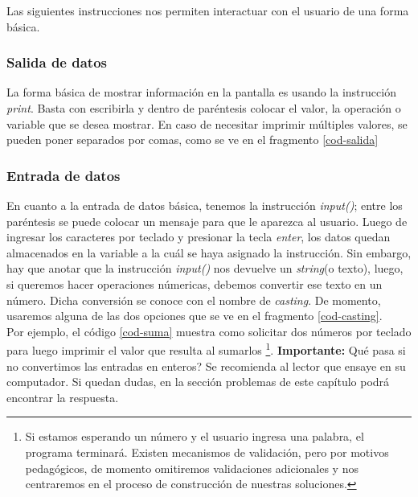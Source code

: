 Las siguientes instrucciones nos permiten interactuar con el usuario de una forma básica.

\subsubsection{Salida de datos}

La forma básica de mostrar información en la pantalla es usando la instrucción \emph{print}. Basta con escribirla y dentro de paréntesis colocar el valor, la operación o variable que se desea mostrar. En caso de necesitar imprimir múltiples valores, se pueden poner separados por comas, como se ve en el fragmento \ref{cod-salida} \\



\subsubsection{Entrada de datos}

En cuanto a la entrada de datos básica, tenemos la instrucción \emph{input()}; entre los paréntesis se puede colocar un mensaje para que le aparezca al usuario. Luego de ingresar los caracteres por teclado y presionar la tecla \emph{enter}, los datos quedan almacenados en la variable a la cuál se haya asignado la instrucción. Sin embargo, hay que anotar que la instrucción \emph{input()} nos devuelve un \emph{string}(o texto), luego, si queremos hacer operaciones númericas, debemos convertir ese texto en un número. Dicha conversión se conoce con el nombre de \emph{casting}. De momento, usaremos alguna de las dos opciones que se ve en el fragmento \ref{cod-casting}. \\



 Por ejemplo, el código \ref{cod-suma} muestra como solicitar dos números por teclado para luego imprimir el valor que resulta al sumarlos \footnote{Si estamos esperando un número y el usuario ingresa una palabra, el programa terminará. Existen mecanismos de validación, pero por motivos pedagógicos, de momento omitiremos validaciones adicionales y nos centraremos en el proceso de construcción de nuestras soluciones.}. 
 \newpage
 \textbf{Importante:} Qué pasa si no convertimos las entradas en enteros? Se recomienda al lector que ensaye en su computador. Si quedan dudas, en la sección problemas de este capítulo podrá encontrar la respuesta. \\

